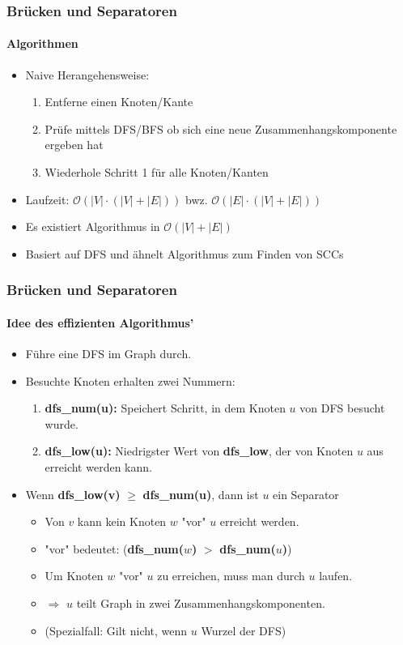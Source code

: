 \begin{frame}
	\frametitle{Brücken und Separatoren}
	\framesubtitle{Algorithmen}
	\begin{itemize}
		\item Naive Herangehensweise:
			\begin{enumerate}
				\item Entferne einen Knoten/Kante
				\item Prüfe mittels DFS/BFS ob sich eine neue Zusammenhangskomponente ergeben hat
				\item Wiederhole Schritt 1 für alle Knoten/Kanten
			\end{enumerate}
			\item Laufzeit: $\mathcal{O}(|V| \cdot (|V| + |E|))$ bwz. $\mathcal{O}(|E| \cdot (|V| + |E|))$
			\item Es existiert Algorithmus  in  $\mathcal{O}(|V| + |E|)$
			\item Basiert auf DFS und ähnelt Algorithmus zum Finden von SCCs
	\end{itemize}
\end{frame}
\begin{frame}
	\frametitle{Brücken und Separatoren}
	\framesubtitle{Idee des effizienten Algorithmus'}
	\begin{itemize}
		\item Führe eine DFS im Graph durch.
		\item Besuchte Knoten erhalten zwei Nummern:
		\pause
			\begin{enumerate}
				\item \textbf{dfs\_num(u):} Speichert Schritt, in dem Knoten $u$ von DFS besucht wurde.
				\item \textbf{dfs\_low(u):} Niedrigster Wert von \textbf{dfs\_low}, der von Knoten $u$ aus erreicht werden kann. 
			\end{enumerate}
			\pause
			\item Wenn \textbf{dfs\_low(v)} $\geq$ \textbf{dfs\_num(u)}, dann ist $u$ ein Separator 
			\pause
			\begin{itemize}
				 \item Von $v$ kann kein Knoten $w$ "vor" $u$ erreicht werden.
				 \item "vor" bedeutet: (\textbf{dfs\_num($w$)} $>$ \textbf{dfs\_num($u$)})
				 \item Um Knoten $w$ "vor" $u$ zu erreichen, muss man durch $u$ laufen.
				 \item $\Rightarrow$ $u$ teilt Graph in zwei Zusammenhangskomponenten.
				 \item (Spezialfall: Gilt nicht, wenn $u$ Wurzel der DFS)
			\end{itemize} 
	\end{itemize}
\end{frame}
